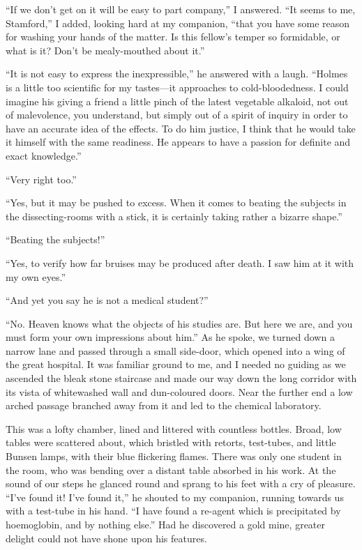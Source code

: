 \documentclass[12pt]{book}
\begin{document}
“If we don’t get on it will be easy to part company,” I answered. “It seems to me, Stamford,” I added, looking hard at my companion, “that you have some reason for washing your hands of the matter. Is this fellow’s temper so formidable, or what is it? Don’t be mealy-mouthed about it.” 

“It is not easy to express the inexpressible,” he answered with a laugh. “Holmes is a little too scientific for my tastes—it approaches to cold-bloodedness. I could imagine his giving a friend a little pinch of the latest vegetable alkaloid, not out of malevolence, you understand, but simply out of a spirit of inquiry in order to have an accurate idea of the effects. To do him justice, I think that he would take it himself with the same readiness. He appears to have a passion for definite and exact knowledge.” 

“Very right too.” 

“Yes, but it may be pushed to excess. When it comes to beating the subjects in the dissecting-rooms with a stick, it is certainly taking rather a bizarre shape.” 

“Beating the subjects!” 

“Yes, to verify how far bruises may be produced after death. I saw him at it with my own eyes.” 

“And yet you say he is not a medical student?” 

“No. Heaven knows what the objects of his studies are. But here we are, and you must form your own impressions about him.” As he spoke, we turned down a narrow lane and passed through a small side-door, which opened into a wing of the great hospital. It was familiar ground to me, and I needed no guiding as we ascended the bleak stone staircase and made our way down the long corridor with its vista of whitewashed wall and dun-coloured doors. Near the further end a low arched passage branched away from it and led to the chemical laboratory. 

This was a lofty chamber, lined and littered with countless bottles. Broad, low tables were scattered about, which bristled with retorts, test-tubes, and little Bunsen lamps, with their blue flickering flames. There was only one student in the room, who was bending over a distant table absorbed in his work. At the sound of our steps he glanced round and sprang to his feet with a cry of pleasure. “I’ve found it! I’ve found it,” he shouted to my companion, running towards us with a test-tube in his hand. “I have found a re-agent which is precipitated by hoemoglobin, and by nothing else.” Had he discovered a gold mine, greater delight could not have shone upon his features. 
\end{document}
